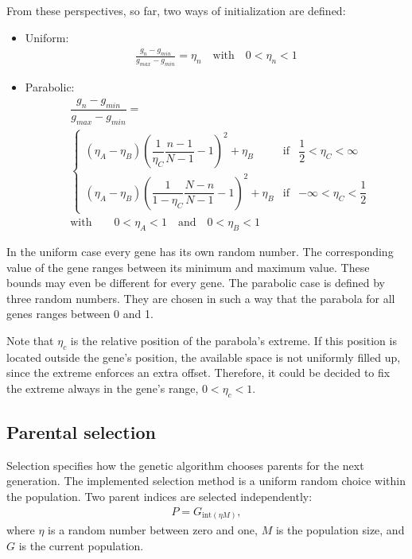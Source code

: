 From these perspectives, so far, two ways of initialization are defined:
\begin{itemize}
	\item Uniform:
	\begin{align}
	\frac{g_{n} - g_{min}}{g_{max} - g_{min}} = \eta_{n}  \quad \text{with} \quad 0 < \eta_{n} < 1
	\end{align}
	\item Parabolic:
	\begin{align}
	\nonumber &\dfrac{g_{n} - g_{min}}{g_{max} - g_{min}} = \\
	&\left\{ \begin{array}{lll}
	\left(\eta_{A} - \eta_{B}\right) \left(\dfrac{1}{\eta_{C}} \dfrac{n-1}{N-1} - 1 \right)^{2} + \eta_{B} & \text{if} & \dfrac{1}{2} < \eta_{C} < \infty \\
	\left(\eta_{A} - \eta_{B}\right) \left(\dfrac{1}{1 - \eta_{C}} \dfrac{N - n}{N-1} - 1 \right)^{2} + \eta_{B} &  \text{if} & -\infty < \eta_{C} < \dfrac{1}{2} 	\end{array} \right. \\
	\nonumber &\text{with} \quad \quad 0 < \eta_{A} < 1 \quad \text{and} \quad 0 < \eta_{B} < 1
	\end{align}
\end{itemize}

In the uniform case every gene has its own random number.
The corresponding value of the gene ranges between its minimum and maximum value.
These bounds may even be different for every gene.
The parabolic case is defined by three random numbers.
They are chosen in such a way that the parabola for all genes ranges between 0 and 1.

Note that $\eta_{c}$ is the relative position of the parabola's extreme.
If this position is located outside the gene's position, the available space is not uniformly filled up, since the extreme enforces an extra offset.
Therefore, it could be decided to fix the extreme always in the gene's range, $0 < \eta_{c} < 1$.

\subsection{Parental selection} 
\label{sec:ParentalSelection}
Selection specifies how the genetic algorithm chooses parents for the next generation.
The implemented selection method is a uniform random choice within the population.
Two parent indices are selected independently:
\begin{align}
P = G_{\text{int}\left(\eta M\right)},
\end{align}
where $\eta$ is a random number between zero and one, $M$ is the population size, and $G$ is the current population.

